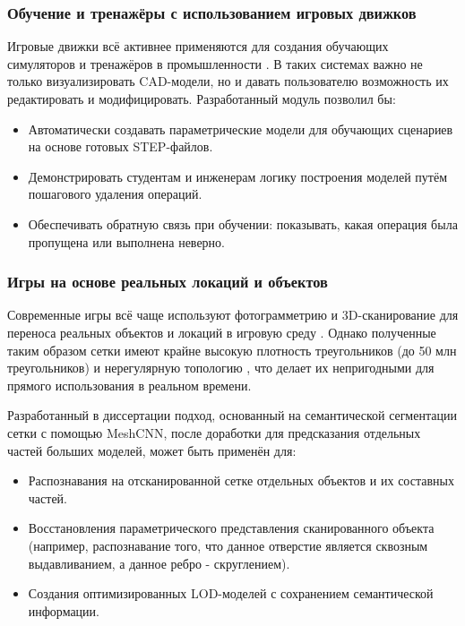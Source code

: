 \subsubsection{Обучение и тренажёры с использованием игровых движков}

Игровые движки всё активнее применяются для создания обучающих симуляторов и тренажёров в промышленности \cite{ieeeTrainer}. В таких системах важно не только визуализировать CAD-модели, но и давать пользователю возможность их редактировать и модифицировать. Разработанный модуль позволил бы:
\begin{itemize}
    \item Автоматически создавать параметрические модели для обучающих сценариев на основе готовых STEP-файлов.
    \item Демонстрировать студентам и инженерам логику построения моделей путём пошагового удаления операций.
    \item Обеспечивать обратную связь при обучении: показывать, какая операция была пропущена или выполнена неверно.
\end{itemize}

\subsubsection{Игры на основе реальных локаций и объектов}

Современные игры всё чаще используют фотограмметрию и 3D-сканирование для переноса реальных объектов и локаций в игровую среду \cite{realityCaptureTutorial}. Однако полученные таким образом сетки имеют крайне высокую плотность треугольников (до 50 млн треугольников) и нерегулярную топологию \cite{instalod}, что делает их непригодными для прямого использования в реальном времени.

Разработанный в диссертации подход, основанный на семантической сегментации сетки с помощью MeshCNN, после доработки для предсказания отдельных частей больших моделей, может быть применён для:
\begin{itemize}
    \item Распознавания на отсканированной сетке отдельных объектов и их составных частей.
    \item Восстановления параметрического представления сканированного объекта (например, распознавание того, что данное отверстие является сквозным выдавливанием, а данное ребро - скруглением).
    \item Создания оптимизированных LOD-моделей с сохранением семантической информации.
\end{itemize}

